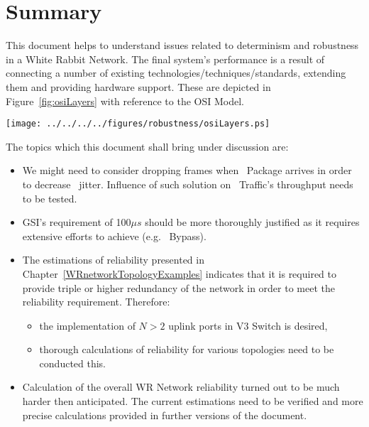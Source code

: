 \chapter{Summary}


This document helps to understand issues related to determinism and robustness
in a White Rabbit Network. The final system's performance is a result of
connecting a number of existing technologies/techniques/standards, extending
them and providing hardware support. These are depicted in
Figure~\ref{fig:osiLayers} with reference to the OSI Model. 


\begin{center}
	\texttt{[image: ../../../../figures/robustness/osiLayers.ps]}
	\label{fig:osiLayers}
\end{center}

The topics which this document shall bring under discussion are:
\begin{itemize}
    \item We might need to consider dropping frames when \HP\ Package arrives in
order to decrease \ControlMessage\ jitter. Influence of such solution
on \SP\ Traffic's throughput needs to be tested.
    \item GSI's requirement of 100$\mu s$ should be more thoroughly justified as
it requires extensive efforts to achieve (e.g. \HP\ Bypass).
    \item The estimations of reliability presented in
Chapter~\ref{WRnetworkTopologyExamples} indicates that it is required to
provide triple or higher redundancy of the network in order to meet the
reliability requirement. Therefore:
   \begin{itemize}
      \item the implementation of $N > 2$ uplink ports in V3 Switch is desired,
      \item thorough calculations of reliability for various topologies need to
	    be conducted this.
   \end{itemize}
 \item Calculation of the overall WR Network
reliability turned out to be
much harder then anticipated. The current estimations need to be verified and
more precise calculations provided in further versions of the document.
\end{itemize}



